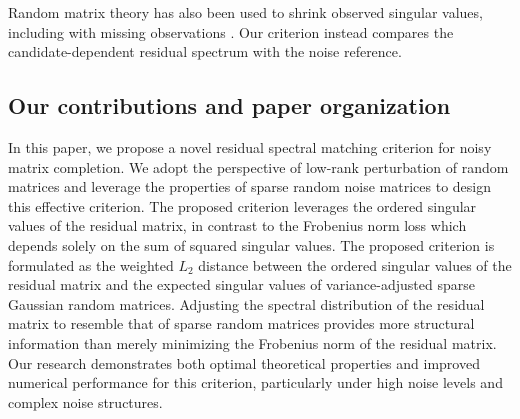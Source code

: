 \documentclass[numsec,webpdf,modern,large,namedate]{oup-authoring-template}
\theoremstyle{plain}
\theoremstyle{remark}
\newif\ifmarkchanges
\newenvironment{revision}{\begingroup\ifmarkchanges\color{red}\fi}{\endgroup}
\begin{document}
\begin{revision}
Random matrix theory has also been used to shrink observed singular values, including with missing observations \citep{nadakuditi2014optshrink}. Our criterion instead compares the candidate-dependent residual spectrum with the noise reference.

\end{revision}

\subsection{Our contributions and paper organization}

In this paper, we propose a novel residual spectral matching criterion for noisy matrix completion. We adopt the perspective of low-rank perturbation of random matrices and leverage the properties of sparse random noise matrices to design this effective criterion. The proposed criterion leverages the ordered singular values of the residual matrix, in contrast to the Frobenius norm loss which depends solely on the sum of squared singular values.
The proposed criterion is formulated as the weighted $L_2$ distance between the ordered singular values of the residual matrix and the expected singular values of variance-adjusted sparse Gaussian random matrices.
Adjusting the spectral distribution of the residual matrix to resemble that of sparse random matrices provides more structural information than merely minimizing the Frobenius norm of the residual matrix.
Our research demonstrates both optimal theoretical properties and improved numerical performance for this criterion, particularly under high noise levels and complex noise structures.
\end{document}
